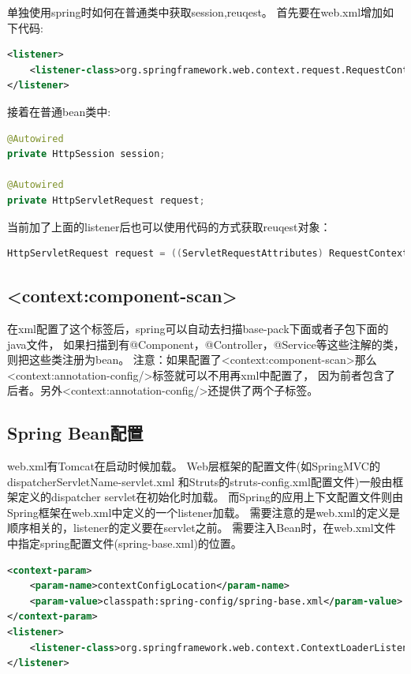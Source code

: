 \documentclass{book}
\begin{document}
单独使用spring时如何在普通类中获取session,reuqest。
首先要在web.xml增加如下代码:

\begin{lstlisting}[language=XML]
<listener>
	<listener-class>org.springframework.web.context.request.RequestContextListener</listener-class>
</listener>
\end{lstlisting}

接着在普通bean类中:

\begin{lstlisting}[language=Java]
@Autowired  
private HttpSession session;  

@Autowired  
private HttpServletRequest request;  
\end{lstlisting}

当前加了上面的listener后也可以使用代码的方式获取reuqest对象：

\begin{lstlisting}[language=Java]
HttpServletRequest request = ((ServletRequestAttributes) RequestContextHolder.getRequestAttributes()).getRequest(); 
\end{lstlisting}

\subsection{<context:component-scan>}

在xml配置了这个标签后，spring可以自动去扫描base-pack下面或者子包下面的java文件，
如果扫描到有@Component，@Controller，@Service等这些注解的类，则把这些类注册为bean。
注意：如果配置了<context:component-scan>那么<context:annotation-config/>标签就可以不用再xml中配置了，
因为前者包含了后者。另外<context:annotation-config/>还提供了两个子标签。

\subsection{Spring Bean配置}

web.xml有Tomcat在启动时候加载。
Web层框架的配置文件(如SpringMVC的dispatcherServletName-servlet.xml
和Struts的struts-config.xml配置文件)一般由框架定义的dispatcher servlet在初始化时加载。
而Spring的应用上下文配置文件则由Spring框架在web.xml中定义的一个listener加载。
需要注意的是web.xml的定义是顺序相关的，listener的定义要在servlet之前。
需要注入Bean时，在web.xml文件中指定spring配置文件(spring-base.xml)的位置。

\begin{lstlisting}[language=XML]
<context-param>
	<param-name>contextConfigLocation</param-name>
	<param-value>classpath:spring-config/spring-base.xml</param-value>
</context-param>
<listener>
	<listener-class>org.springframework.web.context.ContextLoaderListener</listener-class>
</listener>
\end{lstlisting}
\end{document}
